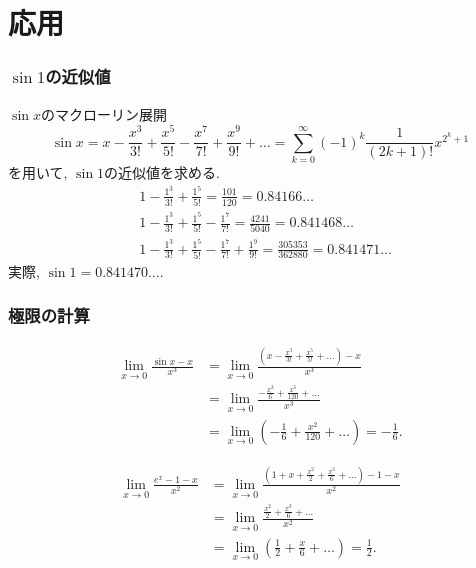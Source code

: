 \section{応用}

\begin{frame}
\frametitle{$\sin 1$の近似値}

$\sin x$のマクローリン展開 
\begin{equation}
\sin x = x-\frac{x^3}{3!}+\frac{x^5}{5!}-\frac{x^7}{7!}+\frac{x^9}{9!}+\dots = \sum_{k=0}^{\infty} (-1)^{k} \frac{1}{(2k+1)!}x^{2^k+1} \nonumber
\end{equation}
を用いて, $\sin 1$の近似値を求める. 
\begin{align*}
& 1-\frac{1^3}{3!}+\frac{1^5}{5!} = \frac{101}{120}=0.84166\dots \\
& 1-\frac{1^3}{3!}+\frac{1^5}{5!}-\frac{1^7}{7!} = \frac{4241}{5040}=0.841468\dots \\
& 1-\frac{1^3}{3!}+\frac{1^5}{5!}-\frac{1^7}{7!}+\frac{1^9}{9!} = \frac{305353}{362880}=0.841471\dots
\end{align*}
実際, $\sin 1 = 0.841470\dots$. 
\end{frame}








\begin{frame}
\frametitle{極限の計算}

\vspace{-5mm}

\begin{align*}
\lim_{x \to 0} \frac{\sin x -x}{x^3} & = \lim_{x \to 0} \frac{(x -\frac{x^3}{3!}+\frac{x^5}{5!}+\dots) -x}{x^3} \\
& =   \lim_{x \to 0} \frac{-\frac{x^3}{6}+\frac{x^5}{120}+\dots}{x^3} \\
& =   \lim_{x \to 0} (-\frac{1}{6}+\frac{x^2}{120}+\dots ) = -\frac{1}{6}. 
\end{align*}

\begin{align*}
\lim_{x \to 0} \frac{e^x-1-x}{x^2} &=  \lim_{x \to 0} \frac{(1+x+\frac{x^2}{2}+\frac{x^3}{6}+\dots )-1-x}{x^2} \\
& = \lim_{x \to 0} \frac{\frac{x^2}{2}+\frac{x^3}{6}+\dots}{x^2} \\
& = \lim_{x \to 0} (\frac{1}{2}+\frac{x}{6}+\dots)= \frac{1}{2}.  
\end{align*}

\end{frame}




